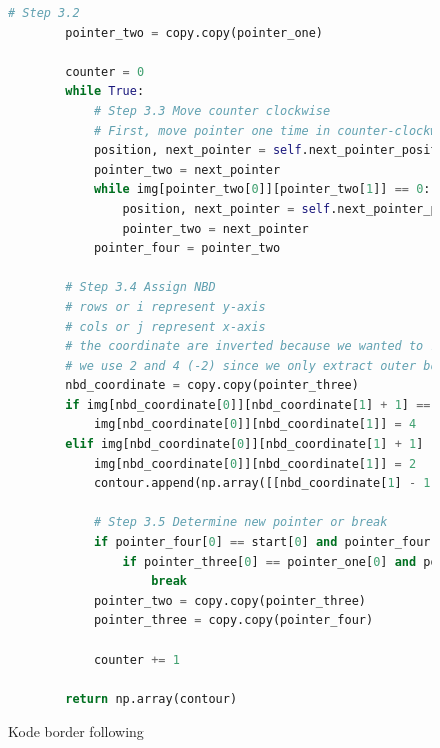 \begin{figure}[H]
	\centering
	\begin{lstlisting}[language=Python, basicstyle=\tiny]
        # Step 3.2
        pointer_two = copy.copy(pointer_one)

        counter = 0
        while True:
            # Step 3.3 Move counter clockwise
            # First, move pointer one time in counter-clockwise direction
            position, next_pointer = self.next_pointer_position(pointer_two, pointer_three, 2)
            pointer_two = next_pointer
            while img[pointer_two[0]][pointer_two[1]] == 0:
                position, next_pointer = self.next_pointer_position(pointer_two, pointer_three, 2)
                pointer_two = next_pointer
            pointer_four = pointer_two
			
		# Step 3.4 Assign NBD
		# rows or i represent y-axis
		# cols or j represent x-axis
		# the coordinate are inverted because we wanted to return a set of (x, y) points, not (y, x)
		# we use 2 and 4 (-2) since we only extract outer border
		nbd_coordinate = copy.copy(pointer_three)
		if img[nbd_coordinate[0]][nbd_coordinate[1] + 1] == 0:
			img[nbd_coordinate[0]][nbd_coordinate[1]] = 4
		elif img[nbd_coordinate[0]][nbd_coordinate[1] + 1] != 0 and img[nbd_coordinate[0]][nbd_coordinate[1]] == 1:
			img[nbd_coordinate[0]][nbd_coordinate[1]] = 2
            contour.append(np.array([[nbd_coordinate[1] - 1, nbd_coordinate[0] - 1]]))

            # Step 3.5 Determine new pointer or break
            if pointer_four[0] == start[0] and pointer_four[1] == start[1]:
                if pointer_three[0] == pointer_one[0] and pointer_three[1] == pointer_one[1]:
                    break
            pointer_two = copy.copy(pointer_three)
            pointer_three = copy.copy(pointer_four)

            counter += 1

        return np.array(contour)
	\end{lstlisting}
	\caption{Kode border following}
	\label{kode:border following}
\end{figure}

